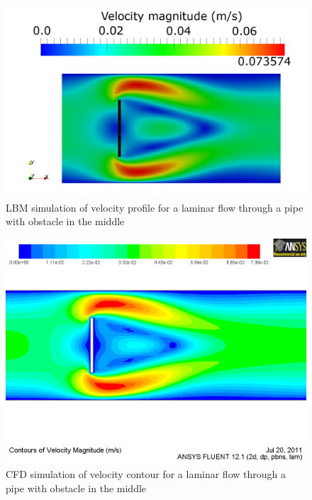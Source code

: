 \begin{figure}[htbp]
\centering
\includegraphics[width=\textwidth]{Chapter3/figures/lbm/LBM_Obstacle.png}
\caption{LBM simulation of velocity profile for a laminar flow through a pipe with obstacle in the middle}
\label{fig:Obstacle}
\end{figure}

\begin{figure}[htbp]
\centering
\includegraphics[width=\textwidth]{Chapter3/figures/lbm/CFD_Obstacle.png}
\caption{CFD simulation of velocity contour for a laminar flow through a pipe with obstacle in the middle}
\label{fig:obsvc}
\end{figure}

